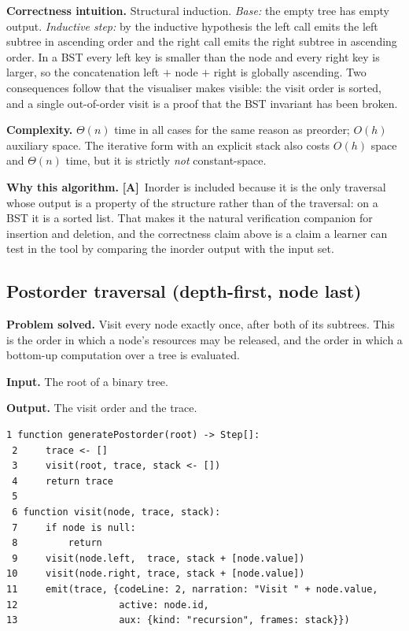 \documentclass[11pt,a4paper]{article}
\newcommand{\A}{\textcolor{asmc}{\textbf{[A]}}}     %
\newcommand{\ct}[1]{\texttt{#1}}
\begin{document}
\noindent\textbf{Correctness intuition.} Structural induction. \emph{Base:} the empty tree has
empty output. \emph{Inductive step:} by the inductive hypothesis the left call emits the left
subtree in ascending order and the right call emits the right subtree in ascending order. In a
BST every left key is smaller than the node and every right key is larger, so the concatenation
left $+$ node $+$ right is globally ascending. Two consequences follow that the visualiser makes
visible: the visit order is sorted, and a single out-of-order visit is a proof that the BST
invariant has been broken.

\smallskip
\noindent\textbf{Complexity.} $\Theta(n)$ time in all cases for the same reason as preorder;
$O(h)$ auxiliary space. The iterative form with an explicit stack also costs $O(h)$ space and
$\Theta(n)$ time, but it is strictly \emph{not} constant-space.

\smallskip
\noindent\textbf{Why this algorithm.} \A\ Inorder is included because it is the only traversal
whose output is a property of the structure rather than of the traversal: on a BST it is a sorted
list. That makes it the natural verification companion for insertion and deletion, and the
correctness claim above is a claim a learner can test in the tool by comparing the inorder output
with the input set.

\subsection{Postorder traversal (depth-first, node last)}

\noindent\textbf{Problem solved.} Visit every node exactly once, after both of its subtrees. This
is the order in which a node's resources may be released, and the order in which a bottom-up
computation over a tree is evaluated.

\smallskip
\noindent\textbf{Input.} The root of a binary tree.

\smallskip
\noindent\textbf{Output.} The visit order and the trace.

\begin{lstlisting}[style=pseudo,caption={Instrumented postorder traversal. The \ct{emit} follows
both recursive calls.},label={lst:postorder}]
 1 function generatePostorder(root) -> Step[]:
 2     trace <- []
 3     visit(root, trace, stack <- [])
 4     return trace
 5
 6 function visit(node, trace, stack):
 7     if node is null:
 8         return
 9     visit(node.left,  trace, stack + [node.value])
10     visit(node.right, trace, stack + [node.value])
11     emit(trace, {codeLine: 2, narration: "Visit " + node.value,
12                  active: node.id,
13                  aux: {kind: "recursion", frames: stack}})
\end{lstlisting}
\end{document}
